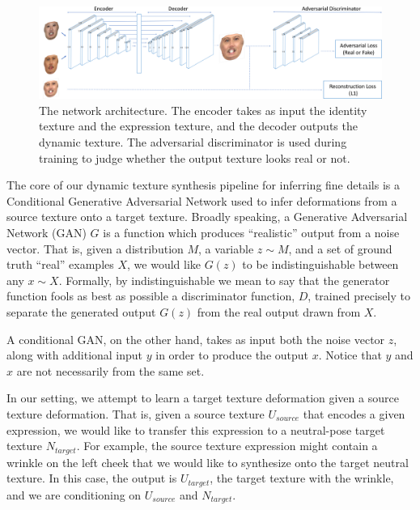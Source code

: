 \begin{figure}[th]
	\centering
	\includegraphics[width=1\linewidth]{figures/network/network.png}
	\caption{The network architecture. The encoder takes as input the identity texture and the expression texture, and the decoder outputs the dynamic texture. The adversarial discriminator is used during training to judge whether the output texture looks real or not.}\label{fig:network}
	\vspace{-0.15in}
\end{figure}

The core of our dynamic texture synthesis pipeline for inferring fine details is a Conditional Generative Adversarial Network used to infer deformations from a source texture onto a target texture.
Broadly speaking, a Generative Adversarial Network (GAN) $G$ is a function which produces ``realistic'' output from a noise vector.  
That is, given a distribution $M$, a variable $z \sim M$, and a set of ground truth ``real'' examples $X$,  we would like $G(z)$ to be indistinguishable between 
any $x \sim X$.  Formally, by indistinguishable we mean to say that the generator function fools as best as possible a discriminator function, $D$, 
trained precisely to separate the generated output $G(z)$ from the real output drawn from $X$.  

A conditional GAN, on the other hand, takes as input both the noise vector $z$, along with additional input $y$ in order to produce the output $x$.    
Notice that $y$ and $x$ are not necessarily from the same set.  

In our setting, we attempt to learn a target texture deformation given a source texture deformation.  
That is, given a source texture $U_{source}$ that encodes a given expression, we would like to transfer this expression to a neutral-pose target texture $N_{target}$.  
For example, the source texture expression might contain a wrinkle on the left cheek that we would like to synthesize onto the target neutral texture. 
In this case, the output is $U_{target}$, the target texture with the wrinkle, and we are conditioning on $U_{source}$ and $N_{target}$.  


